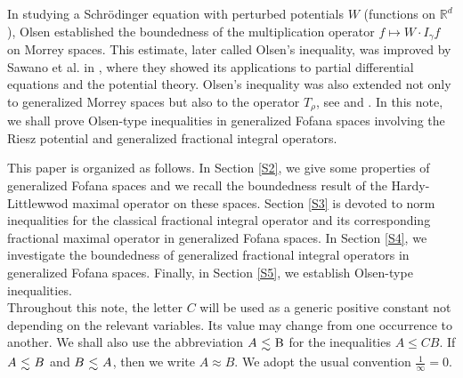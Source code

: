 \documentclass[10pt,a4paper]{amsart}
\numberwithin{equation}{section}
\numberwithin{equation}{section}
\def\lsim{\raisebox{-1ex}{$~\stackrel{\textstyle <}{\sim}~$}}
\begin{document}
In studying a Schr\"odinger equation with perturbed potentials $ W  $ (functions on $ \mathbb{R}^{d} $), Olsen \cite{Ol} established
the boundedness of the multiplication operator $ f \mapsto W \cdot I_{\gamma}f$ on Morrey spaces. This estimate, later called Olsen's inequality, was improved by Sawano et al. in \cite{SST}, where they showed its applications to partial differential equations and the potential theory.  Olsen's inequality was also extended not only to generalized Morrey spaces but also to the operator $T_{\rho}$, see \cite{GE} and \cite{KNS}. In this note, we shall prove Olsen-type inequalities in generalized Fofana spaces involving the Riesz potential and generalized fractional integral operators. 

      
This paper is organized as follows. In Section \ref{S2}, we give some properties of generalized Fofana spaces and we recall the boundedness result of the Hardy-Littlewwod maximal operator on these spaces. Section \ref{S3} is devoted to norm inequalities for the classical fractional integral operator and its corresponding fractional maximal operator in generalized Fofana spaces. In Section \ref{S4}, we investigate the boundedness of generalized fractional integral operators in generalized Fofana spaces. Finally, in Section \ref{S5}, we establish Olsen-type inequalities. \\ 
Throughout this note, the letter $C$ will be used as a generic positive constant not depending on the relevant variables. Its value may change from one occurrence to another. We shall also use the abbreviation $ A \lsim \mathrm{ B}$ for the inequalities $ A\leq C B$. If $ A \lsim B$ and $ B \lsim  A$, then we write $ A\approx  B$. We adopt the usual convention $\frac{1}{\infty} =0$.
\end{document}
